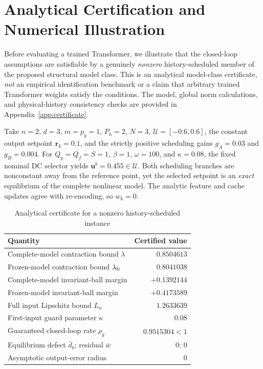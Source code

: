 \documentclass[journal]{IEEEtran}
\theoremstyle{plain}
\theoremstyle{definition}
\newcommand{\vr}{\mathbf{r}}
\newcommand{\vu}{\mathbf{u}}
\begin{document}
\begingroup\color{blue}
\section{Analytical Certification and Numerical Illustration}
\label{sec:experiments}
Before evaluating a trained Transformer, we illustrate that the closed-loop assumptions are satisfiable by a genuinely \emph{nonzero} history-scheduled member of the proposed structural model class. This is an analytical model-class certificate, \emph{not} an empirical identification benchmark or a claim that arbitrary trained Transformer weights satisfy the conditions. The model, global norm calculations, and physical-history consistency checks are provided in Appendix~\ref{app:certificate}.

Take $n=2$, $d=3$, $m=p_y=1$, $P_h=2$, $N=3$, $\mathcal U=[-0.6,0.6]$, the constant output setpoint $\vr_k=0.1$, and the strictly positive scheduling gains $g_A=0.03$ and $g_B=0.004$. For $Q_y=Q_f=S=1$, $\beta=1$, $\omega=100$, and $\kappa=0.08$, the fixed nominal DC selector yields $\vu^b=0.455\in\mathcal U$. Both scheduling branches are nonconstant away from the reference point, yet the selected setpoint is an \emph{exact} equilibrium of the complete nonlinear model. The analytic feature and cache updates agree with re-encoding, so $w_k=0$.

\begin{table}[!t]
\caption{Analytical certificate for a nonzero history-scheduled instance}
\label{tab:certificate}
\centering\footnotesize
\begin{tabular}{lr}
\hline
Quantity & Certified value\\\hline
Complete-model contraction bound $\lambda$ & $0.8504613$\\
Frozen-model contraction bound $\lambda_{\rm fr}$ & $0.8041038$\\
Complete-model invariant-ball margin & $+0.1392144$\\
Frozen-model invariant-ball margin & $+0.4173589$\\
Full input Lipschitz bound $L_u$ & $1.2633639$\\
First-input guard parameter $\kappa$ & $0.08$\\
Guaranteed closed-loop rate $\rho_g$ & $0.9515304<1$\\
Equilibrium defect $\bar d_b$; residual $\bar w$ & $0$; $0$\\
Asymptotic output-error radius & $0$\\\hline
\end{tabular}
\end{table}
\end{document}
